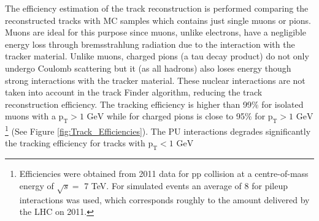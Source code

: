 The efficiency estimation of the track reconstruction is performed comparing the reconstructed tracks with MC samples which 
contains just single muons or pions. Muons are ideal for this purpose since muons, unlike electrons, have a negligible energy loss
through bremsstrahlung radiation due to the interaction with the tracker material. Unlike muons, charged pions (a tau decay product) do not 
only undergo Coulomb scattering but it (as all hadrons) also loses energy though strong interactions with the tracker material. These nuclear 
interactions are not taken into account in the track Finder algorithm, reducing the track reconstruction efficiency. The tracking efficiency 
is higher than 99$\%$ for isolated muons with a $\textrm{p}_{\textrm{T}}>1$ $\textrm{GeV}$ while for charged pions is close 
to 95$\%$ for $\textrm{p}_{\textrm{T}}>1$ $\textrm{GeV}$ \footnote{Efficiencies were obtained from 2011 data for pp collision  
at a centre-of-mass energy of $\sqrt{s} =$  7 TeV. For simulated events an average of 8 for pileup interactions was used, which corresponds
roughly to the amount delivered by the LHC on 2011.} \cite{Chatrchyan:2014fea} (See Figure \ref{fig:Track_Efficiencies}). The PU interactions
degrades significantly the tracking efficiency for tracks with $\textrm{p}_{\textrm{T}}<1$ $\textrm{GeV}$ \cite{Chatrchyan:2014fea}






